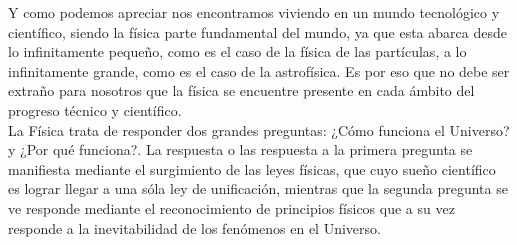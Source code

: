 Y como podemos apreciar nos encontramos viviendo en un mundo tecnológico y científico, siendo la física parte fundamental del 
mundo, ya que esta abarca desde lo infinitamente pequeño, como es el caso de la física de las partículas, a lo infinitamente 
grande, como es el caso de la astrofísica. Es por eso que no debe ser extraño para nosotros que la física se encuentre presente 
en 
cada ámbito del progreso técnico y científico.\\

La Física trata de responder dos grandes preguntas: ¿Cómo funciona el Universo? y ¿Por qué funciona?. La respuesta o las 
respuesta 
a la primera pregunta se manifiesta mediante el surgimiento de las leyes físicas, que cuyo sueño científico es lograr llegar a 
una 
sóla ley de unificación, mientras que la segunda pregunta se ve responde mediante el reconocimiento de principios físicos que a 
su 
vez responde a la inevitabilidad de los fenómenos en el Universo.
